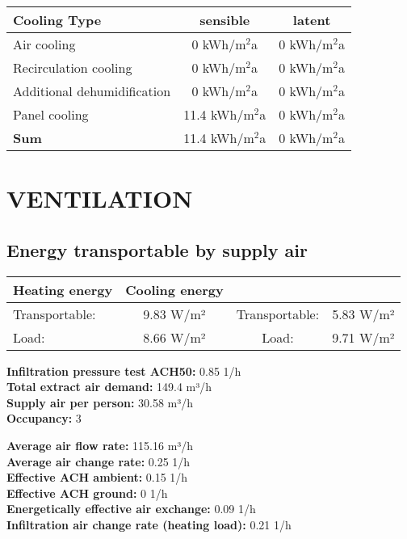 \documentclass{article}
\begin{document}
\begin{tabular}{|l|c|c|}
    \hline
    \textbf{Cooling Type} & \textbf{sensible} & \textbf{latent} \\
    \hline
    Air cooling & 0 kWh/m$^2$a & 0 kWh/m$^2$a \\
    \hline
    Recirculation cooling & 0 kWh/m$^2$a & 0 kWh/m$^2$a \\
    \hline
    Additional dehumidification & 0 kWh/m$^2$a & 0 kWh/m$^2$a \\
    \hline
    Panel cooling & 11.4 kWh/m$^2$a & 0 kWh/m$^2$a \\
    \hline
    \textbf{Sum} & 11.4 kWh/m$^2$a & 0 kWh/m$^2$a \\
    \hline
\end{tabular}

\section*{VENTILATION}

\subsection*{Energy transportable by supply air}
\begin{tabular}{|l|c|c|c|}
    \hline
    \textbf{Heating energy} & \textbf{Cooling energy} \\
    \hline
    Transportable: & 9.83 W/m² & Transportable: & 5.83 W/m² \\
    Load: & 8.66 W/m² & Load: & 9.71 W/m² \\
    \hline
\end{tabular}

\medskip

\textbf{Infiltration pressure test ACH50:} 0.85 1/h \\
\textbf{Total extract air demand:} 149.4 m³/h \\
\textbf{Supply air per person:} 30.58 m³/h \\
\textbf{Occupancy:} 3 \\

\medskip

\textbf{Average air flow rate:} 115.16 m³/h \\
\textbf{Average air change rate:} 0.25 1/h \\
\textbf{Effective ACH ambient:} 0.15 1/h \\
\textbf{Effective ACH ground:} 0 1/h \\
\textbf{Energetically effective air exchange:} 0.09 1/h \\
\textbf{Infiltration air change rate (heating load):} 0.21 1/h \\
\end{document}
